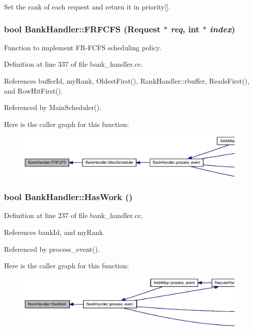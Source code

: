 Set the rank of each request and return it in priority[]. 

\subsubsection[{FRFCFS}]{\setlength{\rightskip}{0pt plus 5cm}bool BankHandler::FRFCFS ({\bf Request} $\ast$ {\em req}, \/  int $\ast$ {\em index})}\label{classBankHandler_97cf9650294ab8a9e7cdd7f5c8fc1a53}


Function to implement FR-FCFS scheduling policy. 



Definition at line 337 of file bank\_\-handler.cc.

References bufferId, myRank, OldestFirst(), RankHandler::rbuffer, ReadsFirst(), and RowHitFirst().

Referenced by MainScheduler().

Here is the caller graph for this function:\nopagebreak
\begin{figure}[H]
\begin{center}
\leavevmode
\includegraphics[width=420pt]{classBankHandler_97cf9650294ab8a9e7cdd7f5c8fc1a53_icgraph}
\end{center}
\end{figure}
\subsubsection[{HasWork}]{\setlength{\rightskip}{0pt plus 5cm}bool BankHandler::HasWork ()}\label{classBankHandler_7990822a023b6ae8d6cf2f195900afd2}




Definition at line 237 of file bank\_\-handler.cc.

References bankId, and myRank.

Referenced by process\_\-event().

Here is the caller graph for this function:\nopagebreak
\begin{figure}[H]
\begin{center}
\leavevmode
\includegraphics[width=420pt]{classBankHandler_7990822a023b6ae8d6cf2f195900afd2_icgraph}
\end{center}
\end{figure}
